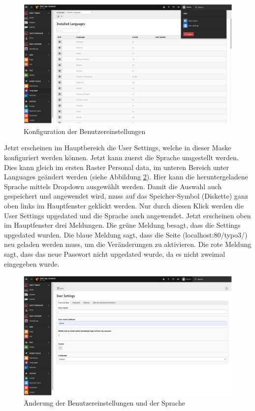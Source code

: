 \begin{figure}[ht!]
\centering
\includegraphics[width=12cm]{Figures/paula/typo3/benutzereinstellungen.png}
\caption{Konfiguration der Benutzereinstellungen}
\label{img:benutzereinstellungen}
\end{figure}

Jetzt erscheinen im Hauptbereich die User Settings, welche in dieser Maske konfiguriert werden können. Jetzt kann zuerst die Sprache umgestellt werden. Dies kann gleich im ersten Raster \glqq Personal data\grqq{}, im unteren Bereich unter Languages geändert werden (siehe Abbildung \ref{img:benutzereinstellungen_sprache}). Hier kann die heruntergeladene Sprache mittels Dropdown ausgewählt werden. Damit die Auswahl auch gespeichert und angewendet wird, muss auf das Speicher-Symbol (Diskette) ganz oben links im Hauptfenster geklickt werden. Nur durch diesen Klick werden die User Settings upgedated und die Sprache auch angewendet. Jetzt erscheinen oben im Hauptfenster drei Meldungen. Die grüne Meldung besagt, dass die Settings upgedated wurden. Die blaue Meldung sagt, dass die Seite (localhost:80/typo3/) neu geladen werden muss, um die Veränderungen zu aktivieren. Die rote Meldung sagt, dass das neue Passwort nicht upgedated wurde, da es nicht zweimal eingegeben wurde.

\begin{figure}[ht!]
\centering
\includegraphics[width=12cm]{Figures/paula/typo3/benutzereinstellungen_sprache.png}
\caption{Änderung der Benutzereinstellungen und der Sprache}
\label{img:benutzereinstellungen_sprache}
\end{figure}

